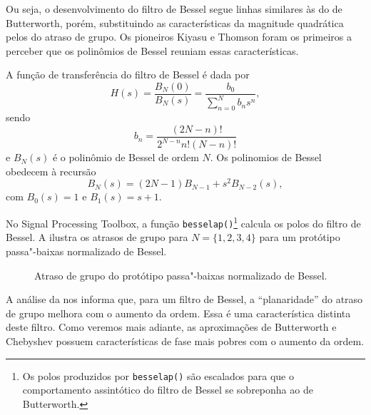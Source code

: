Ou seja, o desenvolvimento do filtro de Bessel segue linhas similares às do de Butterworth, porém, substituindo as características da magnitude quadrática pelos do atraso de grupo. Os pioneiros Kiyasu e Thomson foram os primeiros a perceber que os polinômios de Bessel reuniam essas características.

A função de transferência do filtro de Bessel é dada por
\begin{equation}
	H(s)=\frac{B_N(0)}{B_N(s)}=\frac{b_0}{\displaystyle\sum_{n=0}^Nb_ns^n},
\end{equation}
sendo
\begin{equation}
	b_n=\frac{(2N-n)!}{2^{N-n}n!(N-n)!}
\end{equation}
e $B_N(s)$ é o polinômio de Bessel de ordem $N$. Os polinomios de Bessel obedecem à recursão
\begin{equation}
	B_N(s)=(2N-1)B_{N-1}+s^2B_{N-2}(s),
\end{equation}
com $B_0(s)=1$ e $B_1(s)=s+1$.

No Signal Processing Toolbox, a função \lstinline{besselap()}\footnote{Os polos produzidos por \lstinline{besselap()} são escalados para que o comportamento assintótico do filtro de Bessel se sobreponha ao de Butterworth.} calcula os polos do filtro de Bessel. A  ilustra os atrasos de grupo para $N=\{1,2,3,4\}$ para um protótipo passa"-baixas normalizado de Bessel.

\begin{figure}[ht]
	\centering
	\caption{Atraso de grupo do protótipo passa"-baixas normalizado de Bessel.}
	\label{fig:taugbessel}
\end{figure}

A análise da  nos informa que, para um filtro de Bessel, a \enquote{planaridade} do atraso de grupo melhora com o aumento da ordem. Essa é uma característica distinta deste filtro. Como veremos mais adiante, as aproximações de Butterworth e Chebyshev possuem características de fase mais pobres com o aumento da ordem.
